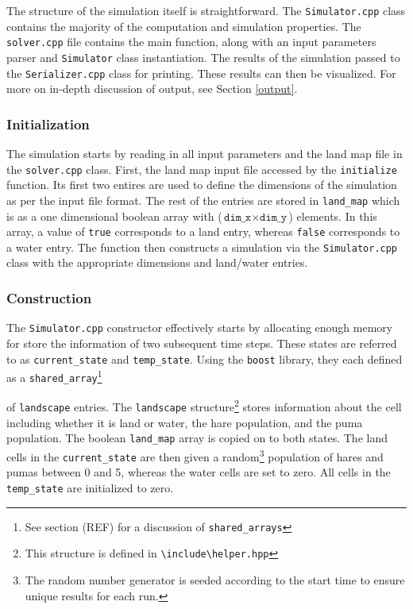 \documentclass[a4paper,11pt]{article}
\begin{document}
{The structure of the simulation itself is straightforward.  The \texttt{Simulator.cpp} class contains the majority of the computation and simulation properties.  The \texttt{solver.cpp} file contains the main function, along with an input parameters parser and \texttt{Simulator} class instantiation.  The results of the simulation passed to the \texttt{Serializer.cpp} class for printing.  These results can then be visualized.  For more on in-depth discussion of output, see Section \ref{output}.

\subsubsection{Initialization}

The simulation starts by reading in all input parameters and the land map file in the \texttt{solver.cpp} class.  First, the land map input file accessed by the \texttt{initialize} function.  Its first two entires are used to define the dimensions of the simulation as per the input file format.  The rest of the entries are stored in \texttt{land\_map} which is as a one dimensional boolean array with ($\texttt{dim\_x} \times \texttt{dim\_y}$) elements.  In this array, a value of \texttt{true} corresponds to a land entry, whereas \texttt{false} corresponds to a water entry.  The function then constructs a simulation via the \texttt{Simulator.cpp} class with the appropriate dimensions and land/water entries.  

\subsubsection{Construction}

The \texttt{Simulator.cpp} constructor effectively starts by allocating enough memory for store the information of two subsequent time steps.  These states are  referred to as \texttt{current\_state} and \texttt{temp\_state}.  Using the \texttt{boost} library, they each defined as a \texttt{shared\_array}\footnote{See section (REF) for a discussion of \texttt{shared\_arrays}}} of \texttt{landscape} entries.  The \texttt{landscape} structure\footnote{This structure is defined in \texttt{\textbackslash include\textbackslash helper.hpp}} stores information about the cell including whether it is land or water, the hare population, and the puma population. The boolean \texttt{land\_map} array is copied on to both states.  The land cells in the \texttt{current\_state} are then given a random\footnote{The random number generator is seeded according to the start time to ensure unique results for each run.} population of hares and pumas between 0 and 5, whereas the water cells are set to zero.  All cells in the \texttt{temp\_state} are initialized to zero.
\end{document}
